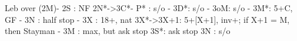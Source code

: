 Leb over (2M)-
2S : NF
2N*->3C*- P* : s/o
        - 3D*: s/o
        - 3oM: s/o
        - 3M*: 5+C, GF
        - 3N : half stop
   - 3X : 18+, nat
3X*->3X+1: 5+[X+1], inv+; if X+1 = M, then Stayman
         - 3M : max, but ask stop
3S*: ask stop
3N : s/o